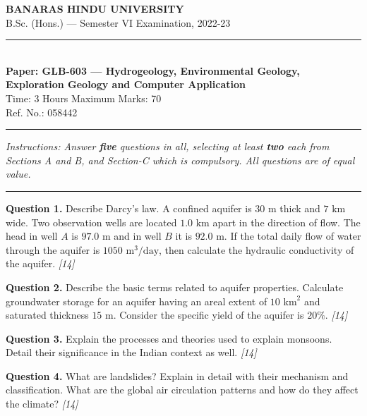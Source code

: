 \documentclass[11pt,a4paper]{article}
\newcommand{\pts}[1]{\hfill   \textit{[#1]}}
\begin{document}
\begin{center}
  {\large\bfseries BANARAS HINDU UNIVERSITY}\\[2pt]
  {\normalsize B.Sc. (Hons.) --- Semester VI Examination, 2022-23}\\[6pt]
  \rule{0.8\linewidth}{0.5pt}\\[6pt]
  {\large\bfseries Paper: GLB-603 --- Hydrogeology, Environmental Geology,\\Exploration Geology and Computer Application}\\[4pt]
  {\normalsize Time: 3 Hours \hfill Maximum Marks: 70}\\[2pt]
  {\small Ref. No.: 058442}
\end{center}
\rule{\linewidth}{0.4pt}
\smallskip



\noindent   \textit{Instructions: Answer   \textbf{five} questions in all, selecting at least   \textbf{two} each from Sections A and B, and Section-C which is compulsory. All questions are of equal value.}
\bigskip

\bigskip


\rule{\linewidth}{0.4pt}\smallskip




\noindent   \textbf{Question 1.} Describe Darcy's law. A confined aquifer is $30 \text{ m}$ thick and $7 \text{ km}$ wide. Two observation wells are located $1.0 \text{ km}$ apart in the direction of flow. The head in well $A$ is $97.0 \text{ m}$ and in well $B$ it is $92.0 \text{ m}$. If the total daily flow of water through the aquifer is $1050 \text{ m}^3 \text{/day}$, then calculate the hydraulic conductivity of the aquifer. \pts{14}

\medskip


\noindent   \textbf{Question 2.} Describe the basic terms related to aquifer properties. Calculate groundwater storage for an aquifer having an areal extent of $10 \text{ km}^2$ and saturated thickness $15 \text{ m}$. Consider the specific yield of the aquifer is $20\%$. \pts{14}

\medskip


\noindent   \textbf{Question 3.} Explain the processes and theories used to explain monsoons. Detail their significance in the Indian context as well. \pts{14}

\medskip


\noindent   \textbf{Question 4.} What are landslides? Explain in detail with their mechanism and classification. What are the global air circulation patterns and how do they affect the climate? \pts{14}
\end{document}
